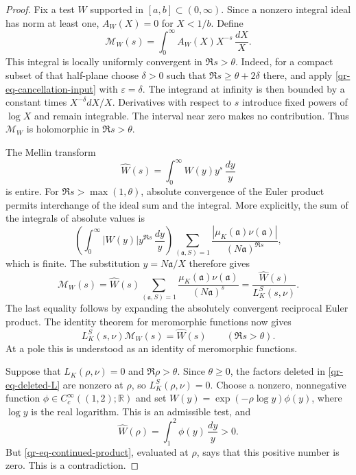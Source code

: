 \begin{proof}
Fix a test $W$ supported in $[a,b]\subset(0,\infty)$. Since a nonzero
integral ideal has norm at least one, $A_W(X)=0$ for $X<1/b$. Define
\[
 \mathcal M_W(s)=\int_0^\infty A_W(X)X^{-s}\,\frac{dX}{X}.
\]
This integral is locally uniformly convergent in $\Re s>\theta$.
Indeed, for a compact subset of that half-plane choose $\delta>0$ such
that $\Re s\geq\theta+2\delta$ there, and apply
\eqref{qr-eq-cancellation-input} with $\varepsilon=\delta$.
The integrand at infinity is then bounded by a constant times
$X^{-\delta}dX/X$. Derivatives with respect to $s$ introduce fixed
powers of $\log X$ and remain integrable. The interval near zero makes
no contribution. Thus $\mathcal M_W$ is holomorphic in $\Re s>\theta$.

The Mellin transform
\[
 \widehat W(s)=\int_0^\infty W(y)y^s\,\frac{dy}{y}
\]
is entire. For $\Re s>\max(1,\theta)$, absolute convergence of the
Euler product permits interchange of the ideal sum and the integral.
More explicitly, the sum of the integrals of absolute values is
\[
 \left(\int_0^\infty |W(y)|y^{\Re s}\,\frac{dy}{y}\right)
 \sum_{(\mathfrak a,S)=1}
 \frac{|\mu_K(\mathfrak a)\nu(\mathfrak a)|}{(N\mathfrak a)^{\Re s}},
\]
which is finite. The substitution $y=N\mathfrak a/X$ therefore gives
\begin{equation}\label{qr-eq-mellin-identity}
 \mathcal M_W(s)=\widehat W(s)
       \sum_{(\mathfrak a,S)=1}
       \frac{\mu_K(\mathfrak a)\nu(\mathfrak a)}{(N\mathfrak a)^s}
       =\frac{\widehat W(s)}{L_K^S(s,\nu)}.
\end{equation}
The last equality follows by expanding the absolutely convergent
reciprocal Euler product. The identity theorem for meromorphic functions
now gives
\begin{equation}\label{qr-eq-continued-product}
 L_K^S(s,\nu)\mathcal M_W(s)=\widehat W(s)
 \qquad(\Re s>\theta).
\end{equation}
At a pole this is understood as an identity of meromorphic functions.

Suppose that $L_K(\rho,\nu)=0$ and $\Re\rho>\theta$. Since
$\theta\geq0$, the factors deleted in \eqref{qr-eq-deleted-L} are
nonzero at $\rho$, so $L_K^S(\rho,\nu)=0$. Choose a nonzero,
nonnegative function $\phi\in C_c^\infty((1,2);\mathbb R)$ and set
$W(y)=\exp(-\rho\log y)\phi(y)$, where $\log y$ is the real logarithm.
This is an admissible test, and
\[
 \widehat W(\rho)=\int_1^2\phi(y)\,\frac{dy}{y}>0.
\]
But \eqref{qr-eq-continued-product}, evaluated at $\rho$, says that this
positive number is zero. This is a contradiction.
\end{proof}

